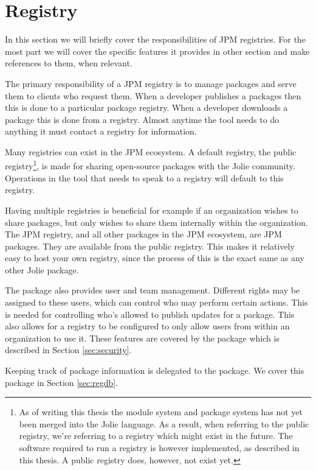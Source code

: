 \section{Registry}
\label{sec:registry}

In this section we will briefly cover the responsibilities of JPM registries.
For the most part we will cover the specific features it provides in other
section and make references to them, when relevant.

The primary responsibility of a JPM registry is to manage packages and serve
them to clients who request them. When a developer publishes a packages then
this is done to a particular package registry. When a developer downloads a
package this is done from a registry. Almost anytime the  tool needs
to do anything it must contact a registry for information.

Many registries can exist in the JPM ecosystem. A default registry, the public
registry\footnote{As of writing this thesis the module system and package
    system has not yet been merged into the Jolie language. As a result, when
    referring to the public registry, we're referring to a registry which might
    exist in the future. The software required to run a registry is however
    implemented, as described in this thesis. A public registry does, however,
    not exist yet.}, is made for sharing open-source packages with the Jolie
community. Operations in the  tool that needs to speak to a registry
will default to this registry.

Having multiple registries is beneficial for example if an organization wishes
to share packages, but only wishes to share them internally within the
organization. The JPM registry, and all other packages in the JPM ecosystem,
are JPM packages. They are available from the public registry. This makes it
relatively easy to host your own registry, since the process of this is the
exact same as any other Jolie package.

The \registry package also provides user and team management. Different rights
may be assigned to these users, which can control who may perform certain
actions. This is needed for controlling who's allowed to publish updates for a
package. This also allows for a registry to be configured to only allow users
from within an organization to use it. These features are covered by the
\security package which is described in Section \ref{sec:security}.

Keeping track of package information is delegated to the \regdb package. We
cover this package in Section \ref{sec:regdb}.
